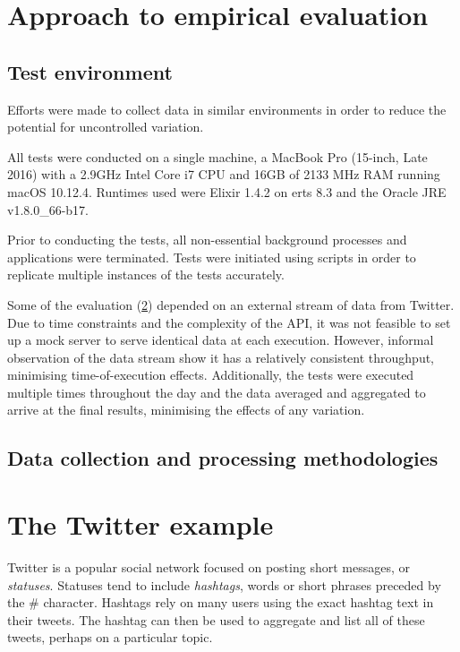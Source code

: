 \section{Approach to empirical evaluation}\label{sec:eval:approach}

\subsection{Test environment}\label{sec:eval:approach:environment}

Efforts were made to collect data in similar environments in order to reduce the potential for uncontrolled variation.

All tests were conducted on a single machine, a MacBook Pro (15-inch, Late 2016) with a 2.9GHz Intel Core i7 CPU and 16GB of 2133 MHz RAM running macOS 10.12.4.
Runtimes used were Elixir 1.4.2 on erts 8.3 and the Oracle JRE v1.8.0\_66-b17.

Prior to conducting the tests, all non-essential background processes and applications were terminated.
Tests were initiated using scripts in order to replicate multiple instances of the tests accurately.

Some of the evaluation (\cref{sec:eval:approach:twitter}) depended on an external stream of data from Twitter.
Due to time constraints and the complexity of the API, it was not feasible to set up a mock server to serve identical data at each execution.
However, informal observation of the data stream show it has a relatively consistent throughput, minimising time-of-execution effects.
Additionally, the tests were executed multiple times throughout the day and the data averaged and aggregated to arrive at the final results, minimising the effects of any variation.

\subsection{Data collection and processing methodologies}\label{sec:eval:approach:collection}


\section{The Twitter example}\label{sec:eval:approach:twitter}

Twitter is a popular social network focused on posting short messages, or \emph{statuses}.
Statuses tend to include \emph{hashtags}, words or short phrases preceded by the \# character.
Hashtags rely on many users using the exact hashtag text in their tweets.
The hashtag can then be used to aggregate and list all of these tweets, perhaps on a particular topic.

